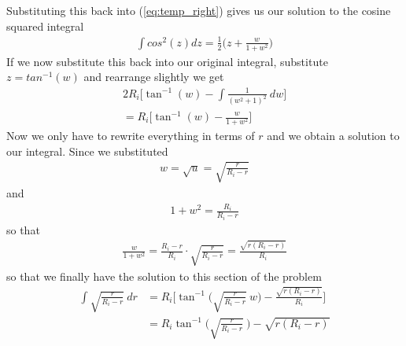 \documentclass{article}
\begin{document}
Substituting this back into (\ref{eq:temp_right}) gives us our solution to the cosine squared integral
\begin{align}
    \int cos^2(z) dz = \frac{1}{2} \bigl(z + \frac{w}{1+w^2}\bigr)
\end{align}
If we now substitute this back into our original integral, substitute $z = tan^{-1}(w)$ and rearrange slightly we get
\begin{align}
    2R_i \Biggl[ \tan^{-1}(w) - \int \frac{1}{(w^2 + 1)^2} ~dw \Biggr]\\
    = R_i \Biggl[ \tan^{-1}(w) - \frac{w}{1+w^2}\Biggr]
\end{align}
Now we only have to rewrite everything in terms of $r$ and we obtain a solution to our integral. Since
we substituted
\begin{align}
    w = \sqrt{u} = \sqrt{\frac{r}{R_i - r}}
\end{align}
and
\begin{align}
    {1+w^2} = \frac{R_i}{R_i - r} 
\end{align}
so that
\begin{align}
    \frac{w}{1+w^2} = \frac{R_i - r}{R_i} \cdot \sqrt{\frac{r}{R_i-r}} = \frac{\sqrt{r( R_i - r)}}{R_i} 
\end{align}
so that we finally have the solution to this section of the problem
\begin{align}
    \int \sqrt{\frac{r}{R_i - r}} ~ dr &= R_i \Biggl[ \tan^{-1}\biggl(\sqrt{\frac{r}{R_i - r}}~w\biggr) - \frac{\sqrt{r( R_i - r)}}{R_i}  \Biggr]\\
    &= R_i \tan^{-1}\biggl(\sqrt{\frac{r}{R_i - r}} ~ \biggr) -\sqrt{r( R_i - r)}
\end{align}
\end{document}
